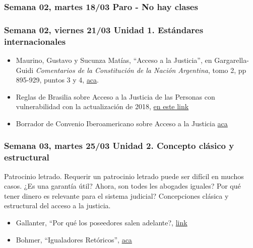 \documentclass[
]{article}
\begin{document}
\subsubsection{Semana 02, martes 18/03 Paro - No hay
clases}\label{semana-02-martes-1803-paro---no-hay-clases}

\subsubsection{Semana 02, viernes 21/03 Unidad 1. Estándares
internacionales}\label{semana-02-viernes-2103-unidad-1.-estuxe1ndares-internacionales}

\begin{itemize}
\item
  Maurino, Gustavo y Sucunza Matías, ``Acceso a la Justicia'', en
  Gargarella- Guidi \emph{Comentarios de la Constitución de la Nación
  Argentina}, tomo 2, pp 895-929, puntos 3 y 4,
  \href{https://drive.google.com/file/d/1On39ejMciqQNjJIpz1fPseKak_KCjuuF/view?usp=sharing}{aca}.
\item
  Reglas de Brasilia sobre Acceso a la Justicia de las Personas con
  vulnerabilidad con la actualización de 2018,
  \href{https://brasilia100r.com/wp-content/uploads/2020/07/Reglas-de-Brasilia-actualizaci\%C3\%B3n-2018.pdf}{en
  este link}
\item
  Borrador de Convenio Iberoamericano sobre Acceso a la Justicia
  \href{https://drive.google.com/file/d/1ZvhBoVmS245Mt4_mxBN_GJOdlh1jDEL5/view?usp=sharing}{aca}
\end{itemize}

\subsubsection{Semana 03, martes 25/03 Unidad 2. Concepto clásico y
estructural}\label{semana-03-martes-2503-unidad-2.-concepto-cluxe1sico-y-estructural}

Patrocinio letrado. Requerir un patrocinio letrado puede ser difícil en
muchos casos. ¿Es una garantía útil? Ahora, son todes les abogades
iguales? Por qué tener dinero es relevante para el sistema judicial?
Concepciones clásica y estructural del acceso a la justicia.

\begin{itemize}
\item
  Gallanter, ``Por qué los poseedores salen adelante?,
  \href{https://drive.google.com/file/d/1Fj3STLmXxHrJglgGgs5JUtDjXy0DSJ3o/view?usp=sharing}{link}
\item
  Bohmer, ``Igualadores Retóricos'',
  \href{https://drive.google.com/file/d/0B50ljTnhr79kMWQ2OTgzYzMtNGNiNS00YjQxLThjYjYtYzg2YWYyNzc0MTlh/view?usp=sharing&resourcekey=0-QzTl1yGSNgnHMOI_ICHjEg}{aca}
\end{itemize}
\end{document}
